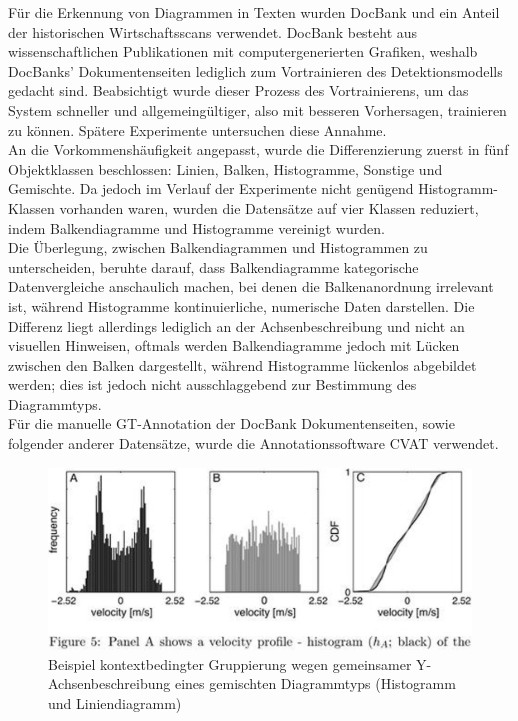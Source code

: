 Für die Erkennung von Diagrammen in Texten wurden DocBank \cite{li2020docbank} und ein Anteil der historischen Wirtschaftsscans verwendet. DocBank besteht aus wissenschaftlichen Publikationen mit computergenerierten Grafiken, weshalb DocBanks' Dokumentenseiten lediglich zum Vortrainieren des Detektionsmodells gedacht sind. Beabsichtigt wurde dieser Prozess des Vortrainierens, um das System schneller und allgemeingültiger, also mit besseren Vorhersagen, trainieren zu können. Spätere Experimente untersuchen diese Annahme.
\\
An die Vorkommenshäufigkeit angepasst, wurde die Differenzierung zuerst in fünf Objektklassen beschlossen: Linien, Balken, Histogramme, Sonstige und Gemischte. Da jedoch im Verlauf der Experimente nicht genügend Histogramm-Klassen vorhanden waren, wurden die Datensätze auf vier Klassen reduziert, indem Balkendiagramme und Histogramme vereinigt wurden.
\\
Die Überlegung, zwischen Balkendiagrammen und Histogrammen zu unterscheiden, beruhte darauf, dass Balkendiagramme kategorische Datenvergleiche anschaulich machen, bei denen die Balkenanordnung irrelevant ist, während Histogramme kontinuierliche, numerische Daten darstellen. Die Differenz liegt allerdings lediglich an der Achsenbeschreibung und nicht an visuellen Hinweisen, oftmals werden Balkendiagramme jedoch mit Lücken zwischen den Balken dargestellt, während Histogramme lückenlos abgebildet werden; dies ist jedoch nicht ausschlaggebend zur Bestimmung des Diagrammtyps.
\\
Für die manuelle GT-Annotation der DocBank Dokumentenseiten, sowie folgender anderer Datensätze, wurde die Annotationssoftware CVAT \cite{CVAT_ai_Corporation_Computer_Vision_Annotation_2023} verwendet.

\begin{figure}[H]
    \centering
    \captionsetup{width=.75\linewidth}
    \includegraphics[width=.75\textwidth]{Methodik/img/docbank_example.png}
    \caption{ Beispiel kontextbedingter Gruppierung wegen gemeinsamer Y-Achsenbeschreibung eines gemischten Diagrammtyps (Histogramm und Liniendiagramm)}
    \label{fig:docbank_example}
\end{figure}

